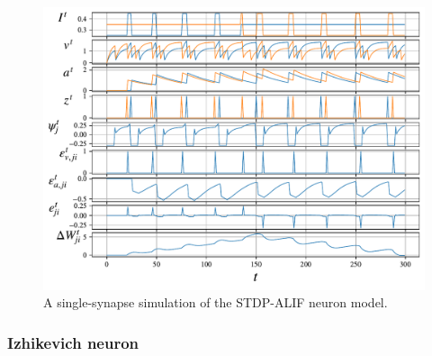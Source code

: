 	        \begin{figure}[!ht]
	            \centering
	            \includegraphics[width=\linewidth]{gfx/stdpalif}
	            \caption[Single-synapse STDP-ALIF simulation]{A single-synapse simulation of the STDP-ALIF neuron model.}
	            \label{fig:stdpalif}
	        \end{figure}

		\subsubsection{Izhikevich neuron}\label{sec:izhikevich}

